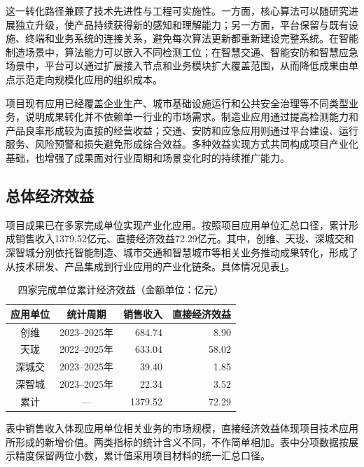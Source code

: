 这一转化路径兼顾了技术先进性与工程可实施性。一方面，核心算法可以随研究进展独立升级，使产品持续获得新的感知和理解能力；另一方面，平台保留与既有设施、终端和业务系统的连接关系，避免每次算法更新都重新建设完整系统。在智能制造场景中，算法能力可以嵌入不同检测工位；在智慧交通、智能安防和智慧应急场景中，平台可以通过扩展接入节点和业务模块扩大覆盖范围，从而降低成果由单点示范走向规模化应用的组织成本。

项目现有应用已经覆盖企业生产、城市基础设施运行和公共安全治理等不同类型业务，说明成果转化并不依赖单一行业的市场需求。制造业应用通过提高检测能力和产品良率形成较为直接的经营收益；交通、安防和应急应用则通过平台建设、运行服务、风险预警和损失避免形成综合效益。多种效益实现方式共同构成项目产业化基础，也增强了成果面对行业周期和场景变化时的持续推广能力。

\subsection{总体经济效益}

项目成果已在多家完成单位实现产业化应用。按照项目应用单位汇总口径，累计形成销售收入1379.52亿元、直接经济效益72.29亿元。其中，创维、天珑、深城交和深智城分别依托智能制造、城市交通和智慧城市等相关业务推动成果转化，形成了从技术研发、产品集成到行业应用的产业化链条。具体情况见表\ref{tab:economic-benefits}。

\begin{table}[htbp]
  \centering
  \caption{四家完成单位累计经济效益（金额单位：亿元）}
  \label{tab:economic-benefits}
  \renewcommand{\arraystretch}{1.25}
  \begin{tabular}{|c|c|r|r|}
    \hline
    \textbf{应用单位} & \textbf{统计周期} & \textbf{销售收入} & \textbf{直接经济效益} \\
    \hline
    创维   & 2023--2025年 & 684.74  & 8.90  \\
    \hline
    天珑   & 2022--2025年 & 633.04  & 58.02 \\
    \hline
    深城交 & 2023--2025年 & 39.40   & 1.85  \\
    \hline
    深智城 & 2023--2025年 & 22.34   & 3.52  \\
    \hline
    累计   & ---           & 1379.52 & 72.29 \\
    \hline
  \end{tabular}
\end{table}

表中销售收入体现应用单位相关业务的市场规模，直接经济效益体现项目技术应用所形成的新增价值。两类指标的统计含义不同，不作简单相加。表中分项数据按展示精度保留两位小数，累计值采用项目材料的统一汇总口径。

